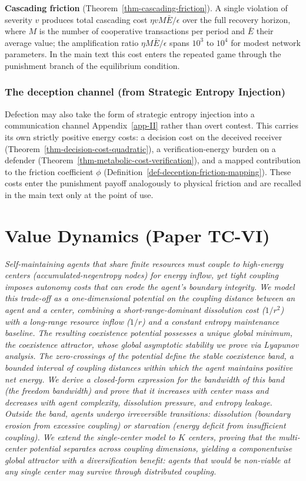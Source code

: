 \documentclass[11pt]{article}
\theoremstyle{plain}
\theoremstyle{definition}
\theoremstyle{remark}
\let\origsection\section
\renewcommand{\section}{\needspace{12\baselineskip}\origsection}
\let\origsubsubsection\subsubsection
\renewcommand{\subsubsection}{\needspace{4\baselineskip}\origsubsubsection}
\begin{document}
\textbf{Cascading friction} (Theorem~\ref{thm-cascading-friction}). A
single violation of severity \(v\) produces total cascading cost
\(\eta v M \bar{E} / \epsilon\) over the full recovery horizon, where
\(M\) is the number of cooperative transactions per period and
\(\bar{E}\) their average value; the amplification ratio
\(\eta M \bar{E}/\epsilon\) spans \(10^3\) to \(10^4\) for modest
network parameters. In the main text this cost enters the repeated game
through the punishment branch of the equilibrium condition.

\subsubsection{The deception channel (from Strategic Entropy
Injection)}\label{the-deception-channel-from-strategic-entropy-injection}

Defection may also take the form of strategic entropy injection into a
communication channel Appendix~\ref{app-II} rather than overt contest.
This carries its own strictly positive energy costs: a decision cost on
the deceived receiver (Theorem~\ref{thm-decision-cost-quadratic}), a
verification-energy burden on a defender
(Theorem~\ref{thm-metabolic-cost-verification}), and a mapped
contribution to the friction coefficient \(\phi\)
(Definition~\ref{def-deception-friction-mapping}). These costs enter the
punishment payoff analogously to physical friction and are recalled in
the main text only at the point of use.

\section{Value Dynamics (Paper TC-VI)}\label{app-VI}

\emph{Self-maintaining agents that share finite resources must couple to
high-energy centers (accumulated-negentropy nodes) for energy inflow,
yet tight coupling imposes autonomy costs that can erode the agent's
boundary integrity. We model this trade-off as a one-dimensional
potential on the coupling distance between an agent and a center,
combining a short-range-dominant dissolution cost (\(1/r^2\)) with a
long-range resource inflow (\(1/r\)) and a constant entropy maintenance
baseline. The resulting coexistence potential possesses a unique global
minimum, the coexistence attractor, whose global asymptotic stability we
prove via Lyapunov analysis. The zero-crossings of the potential define
the stable coexistence band, a bounded interval of coupling distances
within which the agent maintains positive net energy. We derive a
closed-form expression for the bandwidth of this band (the freedom
bandwidth) and prove that it increases with center mass and decreases
with agent complexity, dissolution pressure, and entropy leakage.
Outside the band, agents undergo irreversible transitions: dissolution
(boundary erosion from excessive coupling) or starvation (energy deficit
from insufficient coupling). We extend the single-center model to \(K\)
centers, proving that the multi-center potential separates across
coupling dimensions, yielding a componentwise global attractor with a
diversification benefit: agents that would be non-viable at any single
center may survive through distributed coupling.}
\end{document}
